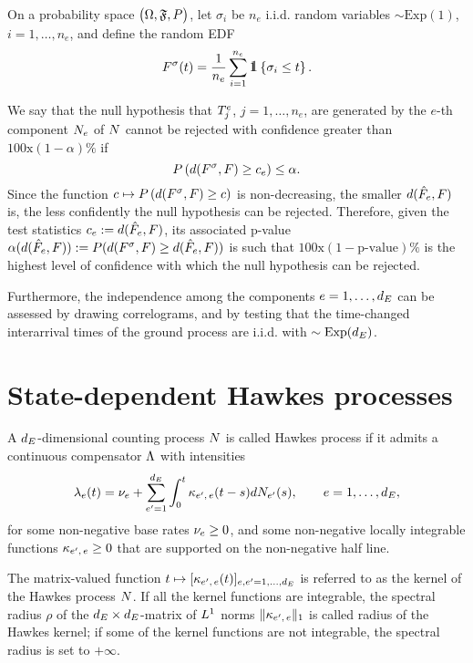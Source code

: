 \documentclass[10pt]{article}
\begin{document}
On a probability space $\probabilitySpace$, let $\sigma_i$ be $n_e$ i.i.d. random variables $\sim \text{Exp}(1)$, $i=1,\dots, n_e$, and define the random EDF 
\begin{equation*}
 F^{\sigma}(t) = \frac{1}{n_e}\sum_{i=1}^{n_e} \one \left\lbrace \sigma_i \leq t\right\rbrace.
\end{equation*}

We say that the null hypothesis that $\arrivalTimes_{j}$, $j=1, \dots, n_e$, are generated by the $e$-th component $\countingProc$ of $\multiCountingProc$ cannot be rejected with confidence greater than $100\text{x}(1-\alpha)\text{\%}$ if 
\begin{equation*}
 \Prob\left( d(F^\sigma, F) \geq c_e \right) \leq \alpha.
\end{equation*}
Since the function $c \mapsto \Prob\left( d(F^\sigma, F) \geq c \right)$ is non-decreasing, the smaller $d(\EDFfun, F)$ is, the less confidently the null hypothesis can be rejected. Therefore, given the test statistics $c_e:=d(\EDFfun, F)$, its associated p-value $\alpha(d(\EDFfun,F)) := \Prob(d(F^\sigma, F) \geq d(\EDFfun,F))$ is such that $100\text{x}(1-\text{p-value})\text{\%}$ is the highest level of confidence with which the null hypothesis can be rejected.

Furthermore, the independence among the components $e=1,\dots, \numEventTypes$ can be assessed by drawing correlograms, and by testing that the time-changed interarrival times of the ground process are i.i.d. with $\sim \text{Exp}(\numEventTypes)$.

\section{State-dependent Hawkes processes}
A $\numEventTypes$-dimensional counting process $\multiCountingProc$ is called Hawkes process if it admits a continuous compensator $\compensator$ with intensities 
\begin{equation}\label{eq.intensity_ordHawkes}
 \intensity(t) = \baseRate_e + \sum_{\eone=1}^{\numEventTypes}\intzerot \hawkesKernel\subscriptee(t-s)d\countingProc[\eone](s), \qquad e=1,\dots,\numEventTypes,
\end{equation}
for some non-negative base rates $\baseRate_e \geq 0$, and some non-negative locally integrable functions $\hawkesKernel\subscriptee \geq 0$ that are supported on the non-negative half line.

The matrix-valued function $t\mapsto [\hawkesKernel\subscriptee(t)]_{e,\eone = 1, \dots, \numEventTypes}$ is referred to as the kernel of the Hawkes process $\multiCountingProc$.  If all the kernel functions are integrable, the spectral radius $\rho$ of the $\numEventTypes\times\numEventTypes$-matrix of $\Lone$ norms $\Vert \hawkesKernel\subscriptee \Vert_{1}$ is called radius of the Hawkes kernel; if some of the kernel functions are not integrable, the spectral radius is set to $+\infty$.  
\end{document}
